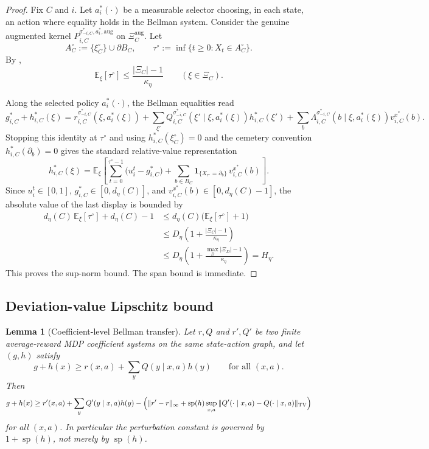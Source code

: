 \documentclass[12pt]{article}
\newtheorem{lemma}[theorem]{Lemma}
\theoremstyle{definition}
\newcommand{\E}{\mathbb{E}}
\newcommand{\1}{\mathbf{1}}
\DeclareMathOperator{\spn}{sp}
\begin{document}
\begin{proof}
Fix $C$ and $i$. Let $a_i^*(\cdot)$ be a measurable selector choosing, in each
state, an action where equality holds in the Bellman system. Consider the genuine
augmented kernel
$P_{i,C}^{\sigma_{-i,C}^*,a_i^*,\mathrm{aug}}$ on
$\Xi_C^{\mathrm{aug}}$. Let
\[
A_C^\circ:=\{\xi_C^\circ\}\cup\partial B_C,
\qquad
\tau^\circ:=\inf\{t\ge 0:X_t\in A_C^\circ\}.
\]
By ,
\[
\E_\xi[\tau^\circ]\le \frac{|\Xi_C|-1}{\kappa_\eta}
\qquad (\xi\in\Xi_C).
\]

Along the selected policy $a_i^*(\cdot)$, the Bellman equalities read
\[
g_{i,C}^*+h_{i,C}^*(\xi)
=
r_{i,C}^{\sigma_{-i,C}^*}(\xi,a_i^*(\xi))
+
\sum_{\xi'}Q_{i,C}^{\sigma_{-i,C}^*}(\xi'\mid\xi,a_i^*(\xi))h_{i,C}^*(\xi')
+
\sum_b\Lambda_{i,C}^{\sigma_{-i,C}^*}(b\mid\xi,a_i^*(\xi))v_{i,C}^{x^*}(b).
\]
Stopping this identity at $\tau^\circ$ and using $h_{i,C}^*(\xi_C^\circ)=0$ and
the cemetery convention $h_{i,C}^*(\partial_b)=0$ gives the standard relative-value
representation
\[
h_{i,C}^*(\xi)
=
\E_\xi\!\left[
\sum_{t=0}^{\tau^\circ-1}\bigl(u_i^t-g_{i,C}^*\bigr)
+
\sum_{b\in B_C}\1_{\{X_{\tau^\circ}=\partial_b\}}\,v_{i,C}^{x^*}(b)
\right].
\]
Since $u_i^t\in[0,1]$, $g_{i,C}^*\in[0,d_\eta(C)]$, and
$v_{i,C}^{x^*}(b)\in[0,d_\eta(C)-1]$, the absolute value of the last display is
bounded by
\[
\begin{aligned}
d_\eta(C)\,\E_\xi[\tau^\circ] + d_\eta(C)-1
&\le
d_\eta(C)\bigl(\E_\xi[\tau^\circ]+1\bigr)
\\
&\le
D_\eta\left(1+\frac{|\Xi_C|-1}{\kappa_\eta}\right)
\\
&\le
D_\eta\left(1+\frac{\max_D|\Xi_D|-1}{\kappa_\eta}\right)
=
H_\eta.
\end{aligned}
\]
This proves the sup-norm bound. The span bound is immediate.
\end{proof}

\subsection{Deviation-value Lipschitz bound}

\begin{lemma}[Coefficient-level Bellman transfer]
\label{lem:coefficient-transfer}
Let $r,Q$ and $r',Q'$ be two finite average-reward MDP coefficient systems on the
same state-action graph, and let $(g,h)$ satisfy
\[
g+h(x)\ge r(x,a)+\sum_y Q(y\mid x,a)h(y)
\qquad\text{for all }(x,a).
\]
Then
\[
g+h(x)
\ge
r'(x,a)+\sum_y Q'(y\mid x,a)h(y)
-\Bigl(\|r'-r\|_\infty + \spn(h)\sup_{x,a}\|Q'(\cdot\mid x,a)-Q(\cdot\mid x,a)\|_{\mathrm{TV}}\Bigr)
\]
for all $(x,a)$. In particular the perturbation constant is governed by
$1+\spn(h)$, not merely by $\spn(h)$.
\end{lemma}
\end{document}
